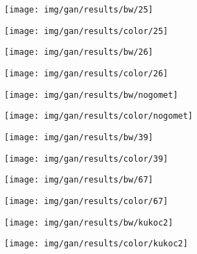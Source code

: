 \begin{figure}[!ht]
	\centering
	\begin{subfigure}{.4\textwidth}
		\centering
		\texttt{[image: img/gan/results/bw/25]}
	\end{subfigure}
    \begin{subfigure}{.4\textwidth}
		\centering
		\texttt{[image: img/gan/results/color/25]}
    \end{subfigure}
\end{figure}
\begin{figure}[!ht]
	\centering
	\begin{subfigure}{.4\textwidth}
		\centering
		\texttt{[image: img/gan/results/bw/26]}
	\end{subfigure}
    \begin{subfigure}{.4\textwidth}
		\centering
		\texttt{[image: img/gan/results/color/26]}
    \end{subfigure}
\end{figure}
\begin{figure}[!ht]
	\centering
	\begin{subfigure}{.4\textwidth}
		\centering
		\texttt{[image: img/gan/results/bw/nogomet]}
	\end{subfigure}
    \begin{subfigure}{.4\textwidth}
		\centering
		\texttt{[image: img/gan/results/color/nogomet]}
    \end{subfigure}
\end{figure}
\begin{figure}[!ht]
	\centering
	\begin{subfigure}{.4\textwidth}
		\centering
		\texttt{[image: img/gan/results/bw/39]}
	\end{subfigure}
    \begin{subfigure}{.4\textwidth}
		\centering
		\texttt{[image: img/gan/results/color/39]}
    \end{subfigure}
\end{figure}
\begin{figure}[!ht]
	\centering
	\begin{subfigure}{.4\textwidth}
		\centering
		\texttt{[image: img/gan/results/bw/67]}
	\end{subfigure}
    \begin{subfigure}{.4\textwidth}
		\centering
		\texttt{[image: img/gan/results/color/67]}
    \end{subfigure}
\end{figure}
\begin{figure}[!ht]
	\centering
	\begin{subfigure}{.4\textwidth}
		\centering
		\texttt{[image: img/gan/results/bw/kukoc2]}
	\end{subfigure}
    \begin{subfigure}{.4\textwidth}
		\centering
		\texttt{[image: img/gan/results/color/kukoc2]}
    \end{subfigure}
\end{figure}

